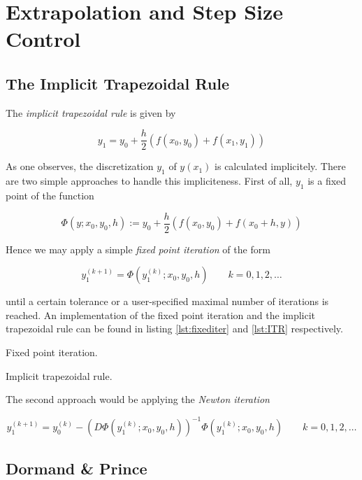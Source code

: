 \section{Extrapolation and Step Size Control}

\subsection{The Implicit Trapezoidal Rule}
The \emph{implicit trapezoidal rule} is given by

\begin{equation}
	y_1 = y_0 + \frac{h}{2}\left( f(x_0,y_0) + f(x_1,y_1) \right)
\end{equation}

As one observes, the discretization $y_1$ of $y(x_1)$ is calculated implicitely. There are two simple approaches to handle this impliciteness. First of all, $y_1$ is a fixed point of the function

\begin{equation}
	\Phi(y;x_0,y_0,h) := y_0 + \frac{h}{2}\left( f(x_0,y_0) + f(x_0 + h,y) \right)
\end{equation}

Hence we may apply a simple \emph{fixed point iteration} of the form

\begin{equation}
	y_1^{(k + 1)} = \Phi\left(y_1^{(k)};x_0,y_0,h\right) \qquad k = 0,1,2,\hdots
\end{equation}

until a certain tolerance or a user-specified maximal number of iterations is reached. An implementation of the fixed point iteration and the implicit trapezoidal rule can be found in listing \ref{lst:fixediter} and \ref{lst:ITR} respectively.

\begin{listing}
	\caption{Fixed point iteration.}
	\label{lst:fixediter}
\end{listing}

\begin{listing}
	\caption{Implicit trapezoidal rule.}
	\label{lst:ITR}
\end{listing}

The second approach would be applying the \emph{Newton iteration}

\begin{equation}
	y_1^{(k + 1)} = y_0^{(k)} - \left( D\Phi\left(y_1^{(k)};x_0,y_0,h\right)\right)^{-1}\Phi\left(y_1^{(k)};x_0,y_0,h\right) \qquad k = 0,1,2,\hdots
\end{equation}

\subsection{Dormand \& Prince}

